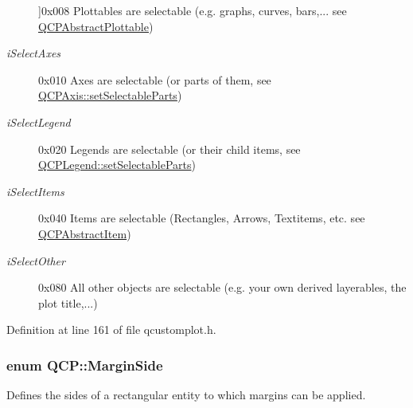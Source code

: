 \begin{Desc}
\begin{description}
{}]{\ttfamily 0x008} Plottables are selectable (e.\-g. graphs, curves, bars,... see \hyperlink{class_q_c_p_abstract_plottable}{Q\-C\-P\-Abstract\-Plottable}) \item[{\em 
\hypertarget{namespace_q_c_p_a2ad6bb6281c7c2d593d4277b44c2b037ad6644ac55bef621645326e9dd7469caa}{i\-Select\-Axes}\label{namespace_q_c_p_a2ad6bb6281c7c2d593d4277b44c2b037ad6644ac55bef621645326e9dd7469caa}
}]{\ttfamily 0x010} Axes are selectable (or parts of them, see \hyperlink{class_q_c_p_axis_a513f9b9e326c505d9bec54880031b085}{Q\-C\-P\-Axis\-::set\-Selectable\-Parts}) \item[{\em 
\hypertarget{namespace_q_c_p_a2ad6bb6281c7c2d593d4277b44c2b037a269c9af298e257d1108edec0432b5513}{i\-Select\-Legend}\label{namespace_q_c_p_a2ad6bb6281c7c2d593d4277b44c2b037a269c9af298e257d1108edec0432b5513}
}]{\ttfamily 0x020} Legends are selectable (or their child items, see \hyperlink{class_q_c_p_legend_a9ce60aa8bbd89f62ae4fa83ac6c60110}{Q\-C\-P\-Legend\-::set\-Selectable\-Parts}) \item[{\em 
\hypertarget{namespace_q_c_p_a2ad6bb6281c7c2d593d4277b44c2b037aea2f7c105d674e76d9b187b02ef29260}{i\-Select\-Items}\label{namespace_q_c_p_a2ad6bb6281c7c2d593d4277b44c2b037aea2f7c105d674e76d9b187b02ef29260}
}]{\ttfamily 0x040} Items are selectable (Rectangles, Arrows, Textitems, etc. see \hyperlink{class_q_c_p_abstract_item}{Q\-C\-P\-Abstract\-Item}) \item[{\em 
\hypertarget{namespace_q_c_p_a2ad6bb6281c7c2d593d4277b44c2b037af67a50bc26147a13b551b3a625374949}{i\-Select\-Other}\label{namespace_q_c_p_a2ad6bb6281c7c2d593d4277b44c2b037af67a50bc26147a13b551b3a625374949}
}]{\ttfamily 0x080} All other objects are selectable (e.\-g. your own derived layerables, the plot title,...) \end{description}
\end{Desc}


Definition at line 161 of file qcustomplot.\-h.

\hypertarget{namespace_q_c_p_a7e487e3e2ccb62ab7771065bab7cae54}{
\subsubsection[{Margin\-Side}]{\setlength{\rightskip}{0pt plus 5cm}enum {\bf Q\-C\-P\-::\-Margin\-Side}}}\label{namespace_q_c_p_a7e487e3e2ccb62ab7771065bab7cae54}
Defines the sides of a rectangular entity to which margins can be applied.

